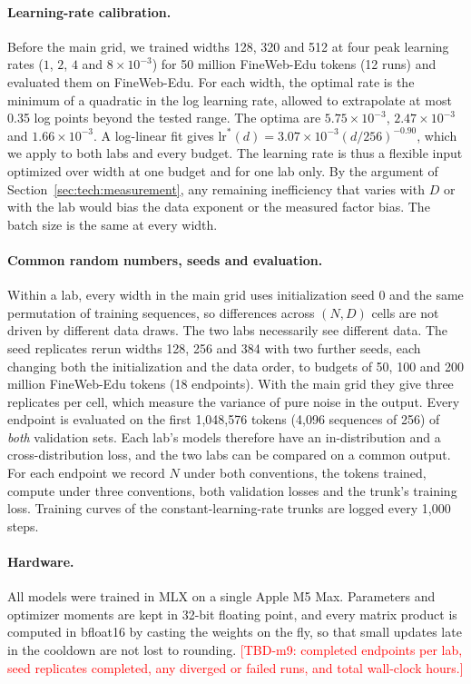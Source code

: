\paragraph{Learning-rate calibration.}
Before the main grid, we trained widths 128, 320 and 512 at four peak learning rates ($1$, $2$, $4$ and
$8\times10^{-3}$) for 50 million FineWeb-Edu tokens (12 runs) and evaluated them on FineWeb-Edu. For each width, the
optimal rate is the minimum of a quadratic in the log learning rate, allowed to extrapolate at most 0.35 log points
beyond the tested range. The optima are $5.75\times10^{-3}$, $2.47\times10^{-3}$ and $1.66\times10^{-3}$. A log-linear
fit gives $\mathrm{lr}^{*}(d)=3.07\times10^{-3}(d/256)^{-0.90}$, which we apply to both labs and every budget. The
learning rate is thus a flexible input optimized over width at one budget and for one lab only. By the argument of
Section~\ref{sec:tech:measurement}, any remaining inefficiency that varies with $D$ or with the lab would bias the data exponent or
the measured factor bias. The batch size is the same at every width.

\paragraph{Common random numbers, seeds and evaluation.}
Within a lab, every width in the main grid uses initialization seed 0 and the same permutation of training sequences,
so differences across $(N,D)$ cells are not driven by different data draws. The two labs necessarily see different
data. The seed replicates rerun widths 128, 256 and 384 with two further seeds, each changing both the initialization
and the data order, to budgets of 50, 100 and 200 million FineWeb-Edu tokens (18 endpoints). With the main grid they give
three replicates per cell, which measure the variance of pure noise in the output. Every endpoint is evaluated on the
first 1,048,576 tokens (4,096 sequences of 256) of \emph{both} validation sets. Each lab's models therefore have an
in-distribution and a cross-distribution loss, and the two labs can be compared on a common output. For each endpoint
we record $N$ under both conventions, the tokens trained, compute under three conventions, both validation losses and
the trunk's training loss. Training curves of the constant-learning-rate trunks are logged every 1,000 steps.

\paragraph{Hardware.}
All models were trained in MLX \citep{hannun2023mlx} on a single Apple M5 Max. Parameters and optimizer moments are
kept in 32-bit floating point, and every matrix product is computed in bfloat16 by casting the weights on the fly, so
that small updates late in the cooldown are not lost to rounding. \textcolor{red}{[TBD-m9: completed endpoints per lab,
seed replicates completed, any diverged or failed runs, and total wall-clock hours.]}

